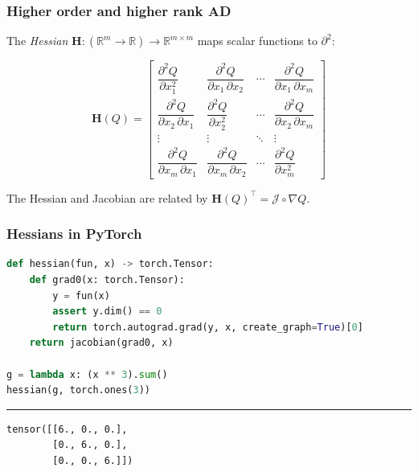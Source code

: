 \documentclass{beamer}
\begin{document}
    \begin{frame}
        \frametitle{Higher order and higher rank AD}

        The \textit{Hessian} $\mathbf{H}:(\mathbb{R}^m\rightarrow\mathbb{R})\rightarrow\mathbb{R}^{m\times m}$ maps scalar functions to $\partial^2$:

        \begin{equation*}
            \mathbf{H}(Q) = \begin{bmatrix}{\dfrac {\partial ^{2}Q}{\partial x_{1}^{2}}}
                                &{\dfrac {\partial ^{2}Q}{\partial x_{1}\,\partial x_{2}}}&\cdots &{\dfrac {\partial ^{2}Q}{\partial x_{1}\,\partial x_{m}}}\\[2.2ex]{\dfrac {\partial ^{2}Q}{\partial x_{2}\,\partial x_{1}}}&{\dfrac {\partial ^{2}Q}{\partial x_{2}^{2}}}&\cdots &{\dfrac {\partial ^{2}Q}{\partial x_{2}\,\partial x_{m}}}\\[2.2ex]\vdots &\vdots &\ddots &\vdots \\[2.2ex]{\dfrac {\partial ^{2}Q}{\partial x_{m}\,\partial x_{1}}}&{\dfrac {\partial ^{2}Q}{\partial x_{m}\,\partial x_{2}}}&\cdots &{\dfrac {\partial ^{2}Q}{\partial x_{m}^{2}}}
            \end{bmatrix}
        \end{equation*}

        The Hessian and Jacobian are related by $\mathbf{H}(Q)^\intercal = \mathcal{J} \circ \nabla Q$.
    \end{frame}

    \begin{frame}[fragile]
        \frametitle{Hessians in PyTorch}
        \begin{lstlisting}[language=Python]
def hessian(fun, x) -> torch.Tensor:
    def grad0(x: torch.Tensor):
        y = fun(x)
        assert y.dim() == 0
        return torch.autograd.grad(y, x, create_graph=True)[0]
    return jacobian(grad0, x)

g = lambda x: (x ** 3).sum()
hessian(g, torch.ones(3))
        \end{lstlisting}

        \noindent\rule{\textwidth}{0.5pt}

        \begin{lstlisting}
tensor([[6., 0., 0.],
        [0., 6., 0.],
        [0., 0., 6.]])
        \end{lstlisting}
    \end{frame}
\end{document}
